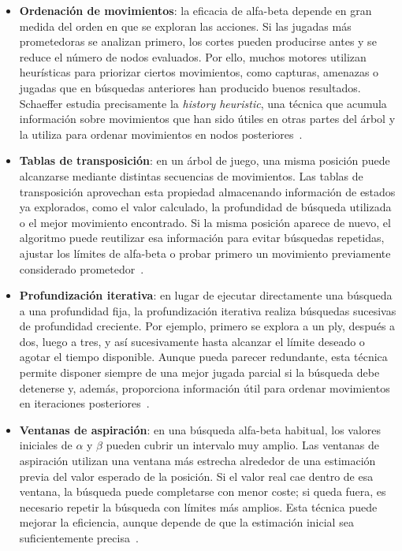 \begin{itemize}
    \item \textbf{Ordenación de movimientos}: la eficacia de alfa-beta depende en gran medida del orden en que se exploran las acciones. Si las jugadas más prometedoras se analizan primero, los cortes pueden producirse antes y se reduce el número de nodos evaluados. Por ello, muchos motores utilizan heurísticas para priorizar ciertos movimientos, como capturas, amenazas o jugadas que en búsquedas anteriores han producido buenos resultados. Schaeffer estudia precisamente la \emph{history heuristic}, una técnica que acumula información sobre movimientos que han sido útiles en otras partes del árbol y la utiliza para ordenar movimientos en nodos posteriores~\cite{schaeffer1989historyHeuristic}.

    \item \textbf{Tablas de transposición}: en un árbol de juego, una misma posición puede alcanzarse mediante distintas secuencias de movimientos. Las tablas de transposición aprovechan esta propiedad almacenando información de estados ya explorados, como el valor calculado, la profundidad de búsqueda utilizada o el mejor movimiento encontrado. Si la misma posición aparece de nuevo, el algoritmo puede reutilizar esa información para evitar búsquedas repetidas, ajustar los límites de alfa-beta o probar primero un movimiento previamente considerado prometedor~\cite{schaeffer1989historyHeuristic, marsland1986gameTreePruning}.

    \item \textbf{Profundización iterativa}: en lugar de ejecutar directamente una búsqueda a una profundidad fija, la profundización iterativa realiza búsquedas sucesivas de profundidad creciente. Por ejemplo, primero se explora a un ply, después a dos, luego a tres, y así sucesivamente hasta alcanzar el límite deseado o agotar el tiempo disponible. Aunque pueda parecer redundante, esta técnica permite disponer siempre de una mejor jugada parcial si la búsqueda debe detenerse y, además, proporciona información útil para ordenar movimientos en iteraciones posteriores~\cite{schaeffer1989historyHeuristic, marsland1986gameTreePruning}.

    \item \textbf{Ventanas de aspiración}: en una búsqueda alfa-beta habitual, los valores iniciales de $\alpha$ y $\beta$ pueden cubrir un intervalo muy amplio. Las ventanas de aspiración utilizan una ventana más estrecha alrededor de una estimación previa del valor esperado de la posición. Si el valor real cae dentro de esa ventana, la búsqueda puede completarse con menor coste; si queda fuera, es necesario repetir la búsqueda con límites más amplios. Esta técnica puede mejorar la eficiencia, aunque depende de que la estimación inicial sea suficientemente precisa~\cite{schaeffer1989historyHeuristic, marsland1986gameTreePruning}.


\end{itemize}
